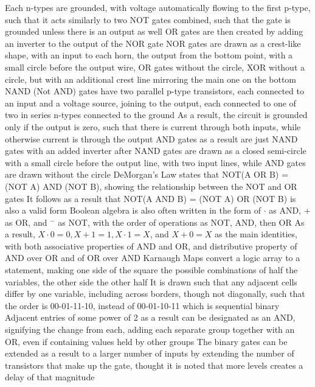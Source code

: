 \documentclass[11 pt, twoside]{article}
\newenvironment{outline*}
{
	\begin{outline}[enumerate]
	}
	{\end{outline}
}
\begin{document}
\begin{outline*}
\3 Each n-types are grounded, with voltage automatically flowing to the first p-type, such that it acts similarly to two NOT gates combined, such that the gate is grounded unless there is an output as well
\3 OR gates are then created by adding an inverter to the output of the NOR gate
\3 NOR gates are drawn as a crest-like shape, with an input to each horn, the output from the bottom point, with a small circle before the output wire, OR gates without the circle, XOR without a circle, but with an additional crest line mirroring the main one on the bottom
\2 NAND (Not AND) gates have two parallel p-type transistors, each connected to an input and a voltage source, joining to the output, each connected to one of two in series n-types connected to the ground
\3 As a result, the circuit is grounded only if the output is zero, such that there is current through both inputs, while otherwise current is through the output
\3 AND gates as a result are just NAND gates with an added inverter after
\3 NAND gates are drawn as a closed semi-circle with a small circle before the output line, with two input lines, while AND gates are drawn without the circle
\2 DeMorgan's Law states that NOT(A OR B) = (NOT A) AND (NOT B), showing the relationship between the NOT and OR gates
\3 It follows as a result that NOT(A AND B) = (NOT A) OR (NOT B) is also a valid form 
\2 Boolean algebra is also often written in the form of $\cdot$ as AND, + as OR, and $^-$ as NOT, with the order of operations as NOT, AND, then OR
\3 As a result, $X \cdot 0 = 0, X + 1 = 1, X \cdot 1 = X$, and $X + 0 = X$ as the main identities, with both associative properties of AND and OR, and distributive property of AND over OR and of OR over AND
\2 Karnaugh Maps convert a logic array to a statement, making one side of the square the possible combinations of half the variables, the other side the other half
\3 It is drawn such that any adjacent cells differ by one variable, including across borders, though not diagonally, such that the order is 00-01-11-10, instead of 00-01-10-11 which is sequential binary
\3 Adjacent entries of some power of 2 as a result can be designated as an AND, signifying the change from each, adding each separate group together with an OR, even if containing values held by other groups
\2 The binary gates can be extended as a result to a larger number of inputs by extending the number of transistors that make up the gate, thought it is noted that more levels creates a delay of that magnitude
\end{outline*}
\end{document}
